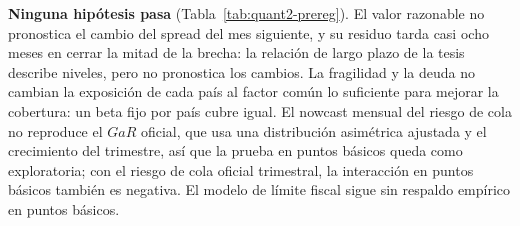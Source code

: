 \textbf{Ninguna hipótesis pasa} (Tabla~\ref{tab:quant2-prereg}). El valor razonable no pronostica el cambio del spread del mes siguiente, y su residuo tarda casi ocho meses en cerrar la mitad de la brecha: la relación de largo plazo de la tesis describe niveles, pero no pronostica los cambios. La fragilidad y la deuda no cambian la exposición de cada país al factor común lo suficiente para mejorar la cobertura: un beta fijo por país cubre igual. El nowcast mensual del riesgo de cola no reproduce el $GaR$ oficial, que usa una distribución asimétrica ajustada y el crecimiento del trimestre, así que la prueba en puntos básicos queda como exploratoria; con el riesgo de cola oficial trimestral, la interacción en puntos básicos también es negativa. El modelo de límite fiscal sigue sin respaldo empírico en puntos básicos.
